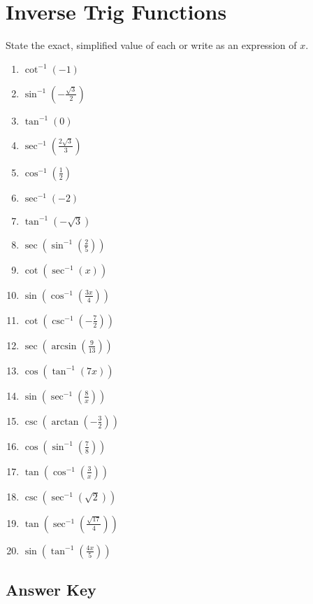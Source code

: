 \chapter{Inverse Trig Functions}

State the exact, simplified value of each or write as an expression of $x$.

\begin{multicols}{2}
\begin{enumerate}
	\item $\cot^{-1}\left(-1\right)$
	\item $\sin^{-1}\left(-\frac{\sqrt{3}}{2	}\right)$
	\item $\tan^{-1}\left(0\right)$
	\item $\sec^{-1}\left(\frac{2\sqrt{3}}{3}\right)$
	\item $\cos^{-1}\left(\frac{1}{2}\right)$
	\item $\sec^{-1}\left(-2\right)$
	\item $\tan^{-1}\left(-\sqrt{3}\right)$
	\item $\sec\left(\sin^{-1}\left(\frac{2}{5}\right)\right)$
	\item $\cot\left(\sec^{-1}(x)\right)$
	\item $\sin\left(\cos^{-1}\left(\frac{3x}{4}\right)\right)$
	\item $\cot\left(\csc^{-1}\left(-\frac{7}{2}\right)\right)$
	\item $\sec\left(\arcsin\left(\frac{9}{13}\right)\right)$
	\item $\cos\left(\tan^{-1}(7x)\right)$
	\item $\sin\left(\sec^{-1}\left(\frac{8}{x}\right)\right)$
	\item $\csc\left(\arctan\left(-\frac{3}{2}\right)\right)$
	\item $\cos\left(\sin^{-1}\left(\frac{7}{8}\right)\right)$
	\item $\tan\left(\cos^{-1}\left(\frac{3}{x}\right)\right)$
	\item $\csc\left(\sec^{-1}\left(\sqrt{2}\right)\right)$
	\item $\tan\left(\sec^{-1}\left(\frac{\sqrt{17}}{4}\right)\right)$
	\item $\sin\left(\tan^{-1}\left(\frac{4x}{5}\right)\right)$
\end{enumerate}
\end{multicols}

\newpage

\section{Answer Key}

